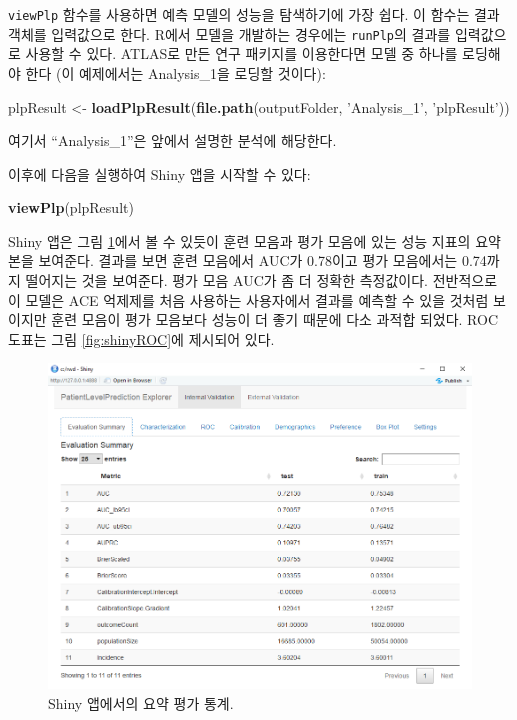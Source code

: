 \documentclass[10.5pt]{book}
\newenvironment{Shaded}{\begin{snugshade}}{\end{snugshade}}
\newcommand{\KeywordTok}[1]{\textcolor[rgb]{0.13,0.29,0.53}{\textbf{#1}}}
\newcommand{\StringTok}[1]{\textcolor[rgb]{0.31,0.60,0.02}{#1}}
\newcommand{\NormalTok}[1]{#1}
\theoremstyle{definition}
\theoremstyle{definition}
\theoremstyle{definition}
\theoremstyle{remark}
\begin{document}
\texttt{viewPlp} 함수를 사용하면 예측 모델의 성능을 탐색하기에 가장
쉽다. 이 함수는 결과 객체를 입력값으로 한다. R에서 모델을 개발하는
경우에는 \texttt{runPlp}의 결과를 입력값으로 사용할 수 있다. ATLAS로
만든 연구 패키지를 이용한다면 모델 중 하나를 로딩해야 한다 (이
예제에서는 Analysis\_1을 로딩할 것이다): 

\begin{Shaded}
\begin{Highlighting}[]
\NormalTok{plpResult <-}\StringTok{ }\KeywordTok{loadPlpResult}\NormalTok{(}\KeywordTok{file.path}\NormalTok{(outputFolder, }
                                     \StringTok{'Analysis_1'}\NormalTok{, }
                                     \StringTok{'plpResult'}\NormalTok{))}
\end{Highlighting}
\end{Shaded}

여기서 ``Analysis\_1''은 앞에서 설명한 분석에 해당한다.

이후에 다음을 실행하여 Shiny 앱을 시작할 수 있다:

\begin{Shaded}
\begin{Highlighting}[]
\KeywordTok{viewPlp}\NormalTok{(plpResult)}
\end{Highlighting}
\end{Shaded}

Shiny 앱은 그림 \ref{fig:shinySummary}에서 볼 수 있듯이 훈련 모음과 평가
모음에 있는 성능 지표의 요약본을 보여준다. 결과를 보면 훈련 모음에서
AUC가 0.78이고 평가 모음에서는 0.74까지 떨어지는 것을 보여준다. 평가
모음 AUC가 좀 더 정확한 측정값이다. 전반적으로 이 모델은 ACE 억제제를
처음 사용하는 사용자에서 결과를 예측할 수 있을 것처럼 보이지만 훈련
모음이 평가 모음보다 성능이 더 좋기 때문에 다소 과적합 되었다. ROC
도표는 그림 \ref{fig:shinyROC}에 제시되어 있다.

\begin{figure}
\includegraphics[width=1\linewidth]{images/PatientLevelPrediction/shinysummary} \caption{Shiny 앱에서의 요약 평가 통계.}\label{fig:shinySummary}
\end{figure}
\end{document}
